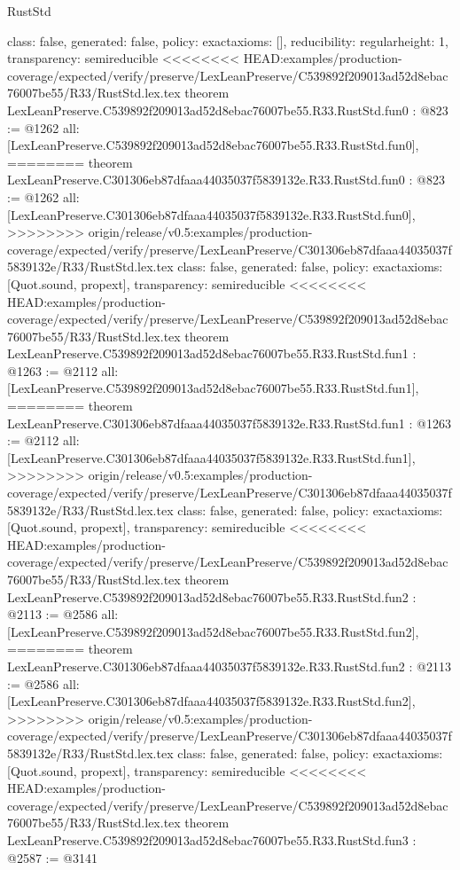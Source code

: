 \begin{lexlean}{RustStd}
\begin{coremodule}
{\begin{coremodule}
{{{  class: false,
  generated: false,
  policy: exact{axioms: []},
  reducibility: regular{height: 1},
  transparency: semireducible
}
<<<<<<<< HEAD:examples/production-coverage/expected/verify/preserve/LexLeanPreserve/C539892f209013ad52d8ebac76007be55/R33/RustStd.lex.tex
theorem LexLeanPreserve.C539892f209013ad52d8ebac76007be55.R33.RustStd.fun0 : @823 := @1262 {
  all: [LexLeanPreserve.C539892f209013ad52d8ebac76007be55.R33.RustStd.fun0],
========
theorem LexLeanPreserve.C301306eb87dfaaa44035037f5839132e.R33.RustStd.fun0 : @823 := @1262 {
  all: [LexLeanPreserve.C301306eb87dfaaa44035037f5839132e.R33.RustStd.fun0],
>>>>>>>> origin/release/v0.5:examples/production-coverage/expected/verify/preserve/LexLeanPreserve/C301306eb87dfaaa44035037f5839132e/R33/RustStd.lex.tex
  class: false,
  generated: false,
  policy: exact{axioms: [Quot.sound, propext]},
  transparency: semireducible
}
<<<<<<<< HEAD:examples/production-coverage/expected/verify/preserve/LexLeanPreserve/C539892f209013ad52d8ebac76007be55/R33/RustStd.lex.tex
theorem LexLeanPreserve.C539892f209013ad52d8ebac76007be55.R33.RustStd.fun1 : @1263 := @2112 {
  all: [LexLeanPreserve.C539892f209013ad52d8ebac76007be55.R33.RustStd.fun1],
========
theorem LexLeanPreserve.C301306eb87dfaaa44035037f5839132e.R33.RustStd.fun1 : @1263 := @2112 {
  all: [LexLeanPreserve.C301306eb87dfaaa44035037f5839132e.R33.RustStd.fun1],
>>>>>>>> origin/release/v0.5:examples/production-coverage/expected/verify/preserve/LexLeanPreserve/C301306eb87dfaaa44035037f5839132e/R33/RustStd.lex.tex
  class: false,
  generated: false,
  policy: exact{axioms: [Quot.sound, propext]},
  transparency: semireducible
}
<<<<<<<< HEAD:examples/production-coverage/expected/verify/preserve/LexLeanPreserve/C539892f209013ad52d8ebac76007be55/R33/RustStd.lex.tex
theorem LexLeanPreserve.C539892f209013ad52d8ebac76007be55.R33.RustStd.fun2 : @2113 := @2586 {
  all: [LexLeanPreserve.C539892f209013ad52d8ebac76007be55.R33.RustStd.fun2],
========
theorem LexLeanPreserve.C301306eb87dfaaa44035037f5839132e.R33.RustStd.fun2 : @2113 := @2586 {
  all: [LexLeanPreserve.C301306eb87dfaaa44035037f5839132e.R33.RustStd.fun2],
>>>>>>>> origin/release/v0.5:examples/production-coverage/expected/verify/preserve/LexLeanPreserve/C301306eb87dfaaa44035037f5839132e/R33/RustStd.lex.tex
  class: false,
  generated: false,
  policy: exact{axioms: [Quot.sound, propext]},
  transparency: semireducible
}
<<<<<<<< HEAD:examples/production-coverage/expected/verify/preserve/LexLeanPreserve/C539892f209013ad52d8ebac76007be55/R33/RustStd.lex.tex
theorem LexLeanPreserve.C539892f209013ad52d8ebac76007be55.R33.RustStd.fun3 : @2587 := @3141 {
}}}}}}
\end{coremodule}}
\end{coremodule}
\end{lexlean}
